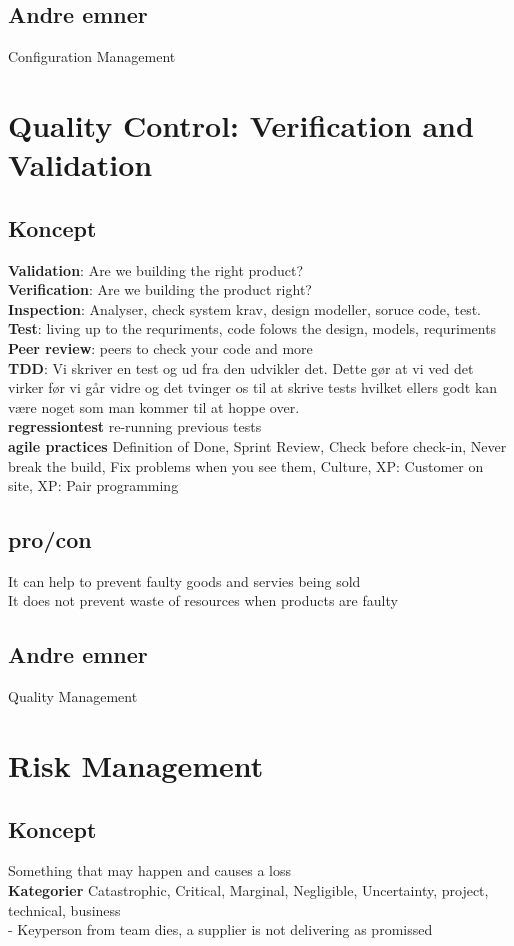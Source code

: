 \documentclass[11pt,a4paper]{article}
\begin{document}
\subsection{Andre emner}
Configuration Management
\newpage
\section{Quality Control: Verification and Validation}
\subsection{Koncept}
\textbf{Validation}: Are we building the right product?\\
\textbf{Verification}: Are we building the product right?\\
\textbf{Inspection}: Analyser, check system krav, design modeller, soruce code, test.\\
\textbf{Test}: living up to the requriments, code folows the design, models, requriments\\
\textbf{Peer review}: peers to check your code and more\\
\textbf{TDD}: Vi skriver en test og ud fra den udvikler det. Dette gør at vi ved det virker før vi går vidre og det tvinger os til at skrive tests hvilket ellers godt kan være noget som man kommer til at hoppe over.\\
\textbf{regressiontest} re-running previous tests\\
\textbf{agile practices} Definition of Done, Sprint Review, Check before check-in, Never break the build, Fix problems when you see them, Culture, XP: Customer on site, XP: Pair programming
\subsection{pro/con}
It can help to prevent faulty goods and servies being sold\\
It does not prevent waste of resources when products are faulty
\subsection{Andre emner}
Quality Management
\newpage
\section{Risk Management}
\subsection{Koncept}
Something that may happen and causes a loss\\
\textbf{Kategorier} Catastrophic, Critical, Marginal, Negligible, Uncertainty, project, technical, business\\
- Keyperson from team dies, a supplier is not delivering as promissed
\end{document}
